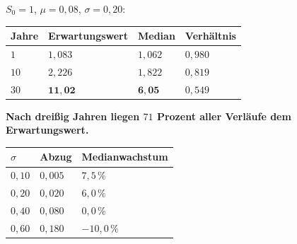 \begin{merksatz}
$S_0 = 1$, $\mu = 0{,}08$, $\sigma = 0{,}20$:

\begin{center}
{\small
\renewcommand{\arraystretch}{1.48}
\begin{tabular}{@{}P{1.4cm}P{2.8cm}P{1.8cm}P{2.0cm}@{}}
\toprule
\textbf{Jahre} & \textbf{Erwartungs\-wert} & \textbf{Median} & \textbf{Verhältnis}\\
\midrule
$1$ & $1{,}083$ & $1{,}062$ & $0{,}980$\\
$10$ & $2{,}226$ & $1{,}822$ & $0{,}819$\\
$30$ & $\mathbf{11{,}02}$ & $\mathbf{6{,}05}$ & $0{,}549$\\
\bottomrule
\end{tabular}}
\end{center}

\begin{center}
\begin{minipage}{0.9\textwidth}
\textbf{Nach dreißig Jahren liegen $71$ Prozent aller Verläufe  dem Erwartungswert.}
\end{minipage}
\end{center}

\begin{center}
\begin{minipage}{0.88\textwidth}
\end{minipage}
\end{center}

\begin{center}
{\small
\renewcommand{\arraystretch}{1.48}
\begin{tabular}{@{}P{1.6cm}P{2.0cm}P{3.2cm}@{}}
\toprule
$\sigma$ & \textbf{Abzug} & \textbf{Median\-wachstum}\\
\midrule
$0{,}10$ & $0{,}005$ & $7{,}5\,\%$\\
$0{,}20$ & $0{,}020$ & $6{,}0\,\%$\\
$0{,}40$ & $0{,}080$ & $0{,}0\,\%$\\
$0{,}60$ & $0{,}180$ & $-10{,}0\,\%$\\
\bottomrule
\end{tabular}}
\end{center}


\end{merksatz}
